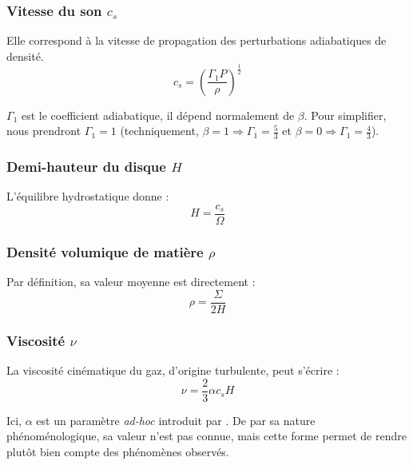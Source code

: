 \subsubsection{\texorpdfstring{Vitesse du son $c_s$}{Vitesse du son cs}}

Elle correspond à la vitesse de propagation des perturbations adiabatiques de
densité.
\begin{equation}
    \label{eq:vitesse_son}
    c_s = \left( \frac{\Gamma_1 P}{\rho} \right)^\frac{1}{2}
\end{equation}

$\Gamma_1$ est le coefficient adiabatique, il dépend normalement de $\beta$.
Pour simplifier, nous prendront $\Gamma_1 = 1$ (techniquement, $\beta = 1
\Rightarrow \Gamma_1 = \frac{5}{3}$ et $\beta = 0 \Rightarrow \Gamma_1
= \frac{4}{3}$).

\subsubsection{\texorpdfstring{Demi-hauteur du disque $H$}{Demi-hauteur du disque H}}

L’équilibre hydrostatique donne :
\begin{equation}
    \label{eq:demi_hauteur}
    H = \frac{c_s}{\Omega}
\end{equation}

\subsubsection{\texorpdfstring{Densité volumique de matière $\rho$}{Densité volumique de matière ρ}}

Par définition, sa valeur moyenne est directement :
\begin{equation}
    \label{eq:densite_volumique}
    \rho = \frac{\Sigma}{2 H}
\end{equation}

\subsubsection{\texorpdfstring{Viscosité $\nu$}{Viscosité ν}}

La viscosité cinématique du gaz, d’origine turbulente, peut s’écrire :
\begin{equation}
    \label{eq:viscosite}
    \nu = \frac{2}{3} \alpha c_s H
\end{equation}

Ici, $\alpha$ est un paramètre \textit{ad-hoc} introduit par \citet{1973}. De
par sa nature phénoménologique, sa valeur n’est pas connue, mais cette forme
permet de rendre plutôt bien compte des phénomènes observés.

